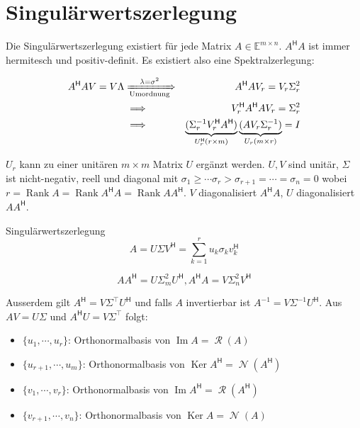 \documentclass[a4paper,10pt]{article}
\DeclareMathOperator{\Rank}{Rank}
\DeclareMathOperator{\Image}{Im}
\DeclareMathOperator{\Columnspace}{\mathcal{R}}
\DeclareMathOperator{\Nullspace}{\mathcal{N}}
\DeclareMathOperator{\Kernel}{Ker}
\newcommand*{\hermconj}{\mathsf{H}}
\def\E{\mathbb{E}}
\begin{document}
\section{Singulärwertszerlegung}

Die Singulärwertszerlegung existiert für jede Matrix $A \in \E^{m \times n}$. $A^\hermconj A$ ist immer hermitesch und positiv-definit. Es existiert also eine Spektralzerlegung:

\begin{align*}
  A^\hermconj A V = V \Lambda & \xRightarrow[\text{Umordnung}]{\lambda = \sigma^2} & A^\hermconj A V_r = V_r \Sigma_r^2\\
  & \implies & V_r^\hermconj A^\hermconj A V_r = \Sigma_r^2\\
  & \implies & \underbrace{(\Sigma_r^{-1} V_r^\hermconj A^\hermconj)}_{U_r^\hermconj (r \times m)} \underbrace{(A V_r \Sigma_r^{-1})}_{U_r (m \times r)} = I\\
\end{align*}

$U_r$ kann zu einer unitären $m \times m$ Matrix $U$ ergänzt werden. $U, V$ sind unitär, $\Sigma$ ist nicht-negativ, reell und diagonal mit $\sigma_1 \geq \cdots \sigma_r > \sigma_{r+1} = \cdots = \sigma_n = 0$ wobei $r = \Rank A = \Rank A^\hermconj A = \Rank A A^\hermconj$. $V$ diagonalisiert $A^\hermconj A$, $U$ diagonalisiert $A A^\hermconj$.

\begin{mainbox}{Singulärwertszerlegung}
  $$A = U \Sigma V^\hermconj = \sum_{k=1}^r u_k \sigma_k v_k^\hermconj$$
\end{mainbox}

$$AA^\hermconj = U \Sigma_m^2 U^\hermconj, A^\hermconj A = V \Sigma_n^2 V^\hermconj$$

Ausserdem gilt $A^\hermconj = V \Sigma^\top U^\hermconj$ und falls $A$ invertierbar ist $A^{-1} = V \Sigma^{-1} U^\hermconj$. Aus $AV = U \Sigma$ und $A^\hermconj U = V \Sigma^\top$ folgt:

\begin{itemize}
  \item $\{u_1, \cdots, u_r\}$: Orthonormalbasis von $\Image A = \Columnspace(A)$
  \item $\{u_{r+1}, \cdots, u_m\}$: Orthonormalbasis von $\Kernel A^\hermconj = \Nullspace(A^\hermconj)$
  \item $\{v_1, \cdots, v_r\}$: Orthonormalbasis von $\Image A^\hermconj = \Columnspace(A^\hermconj)$
  \item $\{v_{r+1}, \cdots, v_n\}$: Orthonormalbasis von $\Kernel A = \Nullspace(A)$
\end{itemize}
\end{document}
